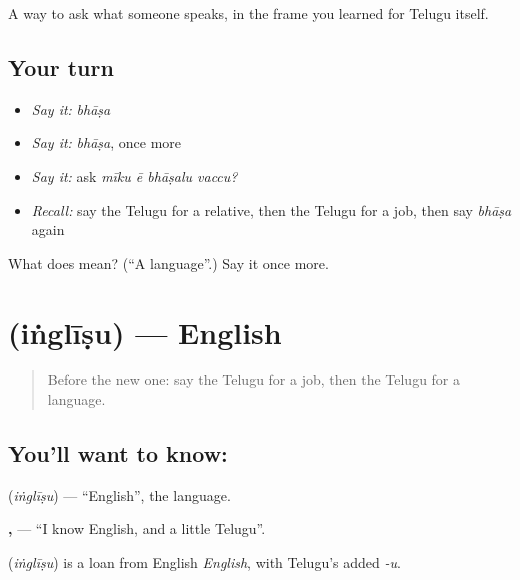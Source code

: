 \begin{grammarlens}[title={What you've built}]
A way to ask what someone speaks, in the frame you learned for Telugu itself.
\end{grammarlens}

\subsection*{Your turn}
\begin{itemize}
\raggedright
  \item \emph{Say it:} \emph{bhāṣa}
  \item \emph{Say it:} \emph{bhāṣa}, once more
  \item \emph{Say it:} ask \emph{mīku ē bhāṣalu vaccu?}
  \item \emph{Recall:} say the Telugu for a relative, then the Telugu for a job, then say \emph{bhāṣa} again
\end{itemize}

\begin{tcolorbox}[breakable,colback=teal!4,colframe=teal!35!black,title={Before you move on}]
What does  mean? (\textquotedblleft{}A language\textquotedblright{}.) Say it once more.
\end{tcolorbox}
\section[\texorpdfstring{\te{ఇంగ్లీషు} (iṅglīṣu)}{ఇంగ్లీషు (iṅglīṣu)}]{ (iṅglīṣu) — English}

\label{lesson:TE-C89-english}



\begin{quote}
Before the new one: say the Telugu for a job, then the Telugu for a language.
\end{quote}

\subsection*{You'll want to know: }
\textbf{} (\emph{iṅglīṣu}) — \textquotedblleft{}English\textquotedblright{}, the language.

\textbf{  ,   } — \textquotedblleft{}I know English, and a little Telugu\textquotedblright{}.

\begin{cousinweb}
\textbf{} (\emph{iṅglīṣu}) is a loan from English \emph{English}, with Telugu's added \emph{-u}.
\end{cousinweb}

